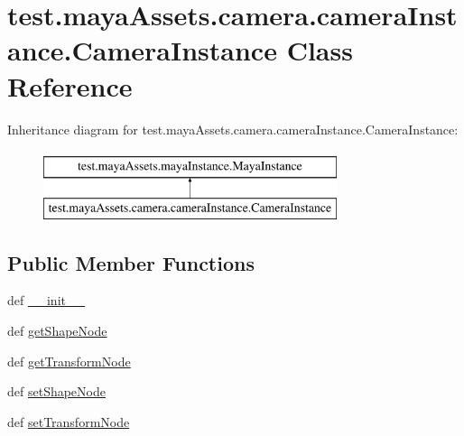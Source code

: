 \hypertarget{classtest_1_1mayaAssets_1_1camera_1_1cameraInstance_1_1CameraInstance}{\section{test.\-maya\-Assets.\-camera.\-camera\-Instance.\-Camera\-Instance \-Class \-Reference}
\label{dc/d9c/classtest_1_1mayaAssets_1_1camera_1_1cameraInstance_1_1CameraInstance}
}
\-Inheritance diagram for test.\-maya\-Assets.\-camera.\-camera\-Instance.\-Camera\-Instance\-:\begin{figure}[H]
\begin{center}
\leavevmode
\includegraphics[height=2.000000cm]{dc/d9c/classtest_1_1mayaAssets_1_1camera_1_1cameraInstance_1_1CameraInstance}
\end{center}
\end{figure}
\subsection*{\-Public \-Member \-Functions}
\begin{DoxyCompactItemize}
\item 
def \hyperlink{classtest_1_1mayaAssets_1_1camera_1_1cameraInstance_1_1CameraInstance_a493b855289b21110f3fa5a22dff6fa20}{\-\_\-\-\_\-init\-\_\-\-\_\-}
\item 
def \hyperlink{classtest_1_1mayaAssets_1_1camera_1_1cameraInstance_1_1CameraInstance_acbc7d6c44127edf445f7691fb34757a7}{get\-Shape\-Node}
\item 
def \hyperlink{classtest_1_1mayaAssets_1_1camera_1_1cameraInstance_1_1CameraInstance_af4983a1852e23d1413fb64122a32dadf}{get\-Transform\-Node}
\item 
def \hyperlink{classtest_1_1mayaAssets_1_1camera_1_1cameraInstance_1_1CameraInstance_ad17707cc18c0a8ae988c251e36c7e45d}{set\-Shape\-Node}
\item 
def \hyperlink{classtest_1_1mayaAssets_1_1camera_1_1cameraInstance_1_1CameraInstance_a3a5608966c31e3f74a03e3fed6eae57b}{set\-Transform\-Node}
\end{DoxyCompactItemize}


